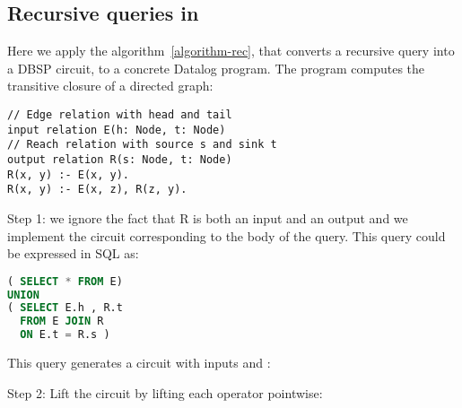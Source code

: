\subsection{Recursive queries in \dbsp}\label{sec:recursive-example}

Here we apply the algorithm~\ref{algorithm-rec}, that converts a
recursive query into a DBSP circuit, to a concrete Datalog program.
The program computes the transitive closure of a directed graph:

\begin{lstlisting}[language=ddlog,basicstyle=\small]
// Edge relation with head and tail
input relation E(h: Node, t: Node)
// Reach relation with source s and sink t
output relation R(s: Node, t: Node)
R(x, y) :- E(x, y).
R(x, y) :- E(x, z), R(z, y).
\end{lstlisting}

Step 1: we ignore the fact that R is both an input and an output and we implement
the \dbsp circuit corresponding to the body of the query.  This query could be expressed
in SQL as:

\begin{lstlisting}[language=SQL,basicstyle=\small]
( SELECT * FROM E)
UNION
( SELECT E.h , R.t
  FROM E JOIN R
  ON E.t = R.s )
\end{lstlisting}

This query generates a \dbsp circuit with inputs  and :


Step 2: Lift the circuit by lifting each operator pointwise:


